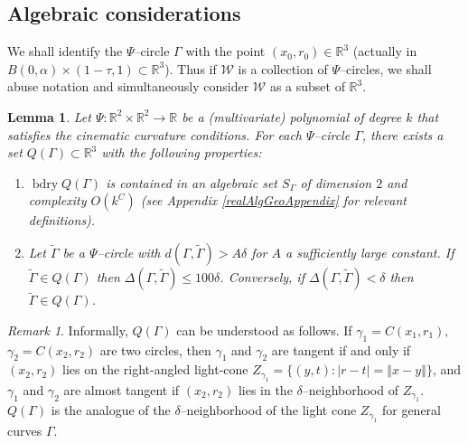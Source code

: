 \documentclass[reqno]{amsart}
\newtheorem{lem}[thm]{Lemma}
\theoremstyle{definition}
\theoremstyle{remark}
\newtheorem{rem}[thm]{Remark}
\theoremstyle{remark}
\newcommand{\norm}[1]{\left\Vert#1\right\Vert}
\newcommand{\RR}{\mathbb{R}}
\newcommand{\WC}{\mathcal W}
\newcommand{\bdry}{\operatorname{bdry}}
\begin{document}
\subsection{Algebraic considerations}
We shall identify the $\Psi$--circle $\Gamma$ with the point $(x_0,r_0)\in\RR^3$ (actually in $B(0,\alpha)\times(1-\tau,1)\subset\RR^3$). Thus if $\WC$ is a collection of $\Psi$--circles, we shall abuse notation and simultaneously consider $\WC$ as a subset of $\RR^3$.
%
%
\begin{lem}\label{constructionOfSandwich}
Let $\Psi\colon\RR^2\times\RR^2\to\RR$ be a (multivariate) polynomial of degree $k$ that satisfies the cinematic curvature conditions. For each $\Psi$--circle $\Gamma$, there exists a set $Q(\Gamma)\subset\RR^3$ with the following properties:
\begin{enumerate}[label=(\roman{*}), ref=(\roman{*})]
\item\label{sandwichProperty1} $\bdry Q(\Gamma)$ is contained in an algebraic set $S_\Gamma$ of dimension $2$ and complexity $O(k^C)$ (see Appendix \ref{realAlgGeoAppendix} for relevant definitions).%
\item\label{sandwichProperty2} Let $\tilde\Gamma$ be a $\Psi$--circle with $d(\Gamma,\tilde\Gamma)>A\delta$ for $A$ a sufficiently large constant. If $\tilde\Gamma\in Q(\Gamma)$ then $\Delta(\Gamma,\tilde\Gamma)\leq100\delta$. Conversely, if $\Delta(\Gamma,\tilde\Gamma)<\delta$ then $\tilde\Gamma\in Q(\Gamma)$.
\end{enumerate}
\end{lem}
\begin{rem}
Informally, $Q(\Gamma)$ can be understood as follows. If $\gamma_1=C(x_1,r_1),$ $\gamma_2=C(x_2,r_2)$ are two circles, then $\gamma_1$ and $\gamma_2$ are tangent if and only if $(x_2,r_2)$ lies on the right-angled light-cone $Z_{\gamma_1}=\{(y,t)\colon |r-t| = \norm{x-y}\}$, and $\gamma_1$ and $\gamma_2$ are almost tangent if $(x_2,r_2)$ lies in the $\delta$--neighborhood of $Z_{\gamma_1}$. $Q(\Gamma)$ is the analogue of the $\delta$--neighborhood of the light cone $Z_{\gamma_1}$ for general curves $\Gamma$.
\end{rem}
%
\end{document}
